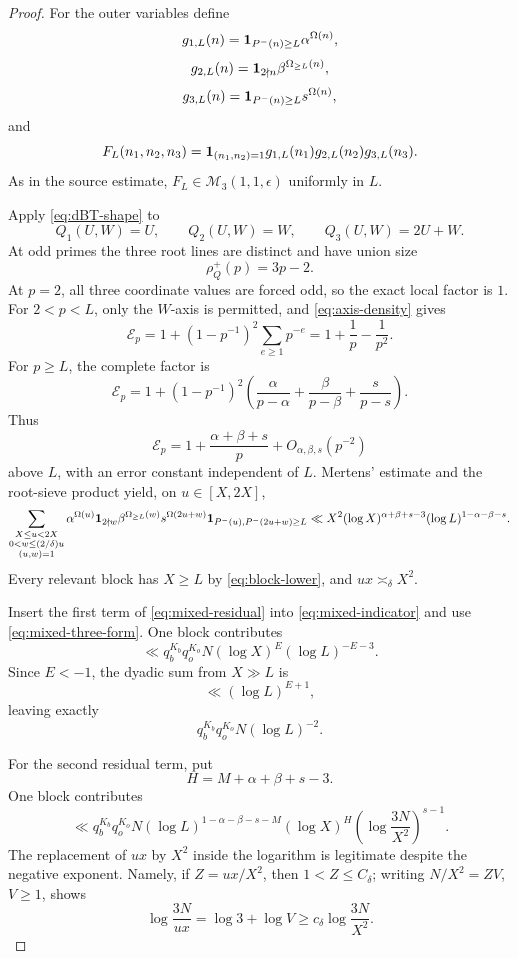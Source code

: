 \documentclass[11pt]{article}
\begin{document}
\begin{proof}
For the outer variables define
\[
 g_{1,L}(n)=\mathbf 1_{P^-(n)\geq L}\alpha^{\Omega(n)},
\]
\[
 g_{2,L}(n)=\mathbf 1_{2\nmid n}\beta^{\Omega_{\geq L}(n)},
\]
\[
 g_{3,L}(n)=\mathbf 1_{P^-(n)\geq L}s^{\Omega(n)},
\]
and
\[
 F_L(n_1,n_2,n_3)=
 \mathbf 1_{(n_1,n_2)=1}
 g_{1,L}(n_1)g_{2,L}(n_2)g_{3,L}(n_3).
\]
As in the source estimate,
\(F_L\in\mathcal M_3(1,1,\epsilon)\) uniformly in \(L\).

Apply \eqref{eq:dBT-shape} to
\[
 Q_1(U,W)=U,\qquad Q_2(U,W)=W,\qquad Q_3(U,W)=2U+W.
\]
At odd primes the three root lines are distinct and have union size
\[
 \rho_Q^+(p)=3p-2.
\]
At \(p=2\), all three coordinate values are forced odd, so the exact local
factor is \(1\). For \(2<p<L\), only the \(W\)-axis is permitted, and
\eqref{eq:axis-density} gives
\begin{equation}\label{eq:mixed-small-factor}
 \mathcal E_p
 =1+(1-p^{-1})^2\sum_{e\geq1}p^{-e}
 =1+\frac1p-\frac1{p^2}.
\end{equation}
For \(p\geq L\), the complete factor is
\begin{equation}\label{eq:mixed-large-factor}
 \mathcal E_p
 =1+(1-p^{-1})^2
 \left(
  \frac{\alpha}{p-\alpha}
  +\frac{\beta}{p-\beta}
  +\frac{s}{p-s}
 \right).
\end{equation}
Thus
\[
 \mathcal E_p
 =1+\frac{\alpha+\beta+s}{p}
 +O_{\alpha,\beta,s}(p^{-2})
\]
above \(L\), with an error constant independent of \(L\). Mertens' estimate
and the root-sieve product yield, on \(u\in[X,2X]\),
\begin{equation}\label{eq:mixed-three-form}
 \sum_{\substack{X\leq u<2X\\
                  0<w\leq(2/\delta)u\\(u,w)=1}}
 \alpha^{\Omega(u)}
 \mathbf 1_{2\nmid w}\beta^{\Omega_{\geq L}(w)}
 s^{\Omega(2u+w)}
 \mathbf 1_{P^-(u),P^-(2u+w)\geq L}
 \ll
 X^2(\log X)^{\alpha+\beta+s-3}
 (\log L)^{1-\alpha-\beta-s}.
\end{equation}
Every relevant block has \(X\geq L\) by \eqref{eq:block-lower}, and
\(ux\asymp_\delta X^2\).

Insert the first term of \eqref{eq:mixed-residual} into
\eqref{eq:mixed-indicator} and use \eqref{eq:mixed-three-form}. One block
contributes
\[
 \ll q_b^{K_b}q_o^{K_o}N
 (\log X)^E(\log L)^{-E-3}.
\]
Since \(E<-1\), the dyadic sum from \(X\gg L\) is
\[
 \ll(\log L)^{E+1},
\]
leaving exactly
\[
 q_b^{K_b}q_o^{K_o}N(\log L)^{-2}.
\]

For the second residual term, put
\[
 H=M+\alpha+\beta+s-3.
\]
One block contributes
\begin{equation}\label{eq:mixed-second-block}
 \ll q_b^{K_b}q_o^{K_o}N
 (\log L)^{1-\alpha-\beta-s-M}
 (\log X)^H
 \left(\log\frac{3N}{X^2}\right)^{s-1}.
\end{equation}
The replacement of \(ux\) by \(X^2\) inside the logarithm is legitimate
despite the negative exponent. Namely, if \(Z=ux/X^2\), then
\(1<Z\leq C_\delta\); writing \(N/X^2=ZV\), \(V\geq1\), shows
\[
 \log\frac{3N}{ux}
 =\log3+\log V
 \geq c_\delta\log\frac{3N}{X^2}.
\]


\end{proof}
\end{document}

